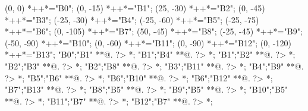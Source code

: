 \begin{scriptsize}
\xy(0, 0)
	*++{}*\frm{-,}="B0";
(0, -15)
	*++{}*\frm{-,}="B1";
(25, -30)
	*++{}*\frm{-,}="B2";
(0, -45)
	*++{}*\frm{-,}="B3";
(-25, -30)
	*++{}*\frm{-,}="B4";
(-25, -60)
	*++{}*\frm{-,}="B5";
(-25, -75)
	*++{}*\frm{-,}="B6";
(0, -105)
	*++{}*\frm{-,}="B7";
(50, -45)
	*++{}*\frm{-,}="B8";
(-25, -45)
	*++{}*\frm{-,}="B9";
(-50, -90)
	*++{}*\frm{-,}="B10";
(0, -60)
	*++{}*\frm{-,}="B11";
(0, -90)
	*++{}*\frm{-,}="B12";
(0, -120)
	*++{}*\frm{-,}="B13";
"B0";"B1" **@{.} ?> *{\dir{>}};
"B1";"B4" **@{.} ?> *{\dir{>}};
"B1";"B2" **@{.} ?> *{\dir{>}};
"B2";"B3" **@{.} ?> *{\dir{>}};
"B2";"B8" **@{.} ?> *{\dir{>}};
"B3";"B11" **@{.} ?> *{\dir{>}};
"B4";"B9" **@{.} ?> *{\dir{>}};
"B5";"B6" **@{.} ?> *{\dir{>}};
"B6";"B10" **@{.} ?> *{\dir{>}};
"B6";"B12" **@{.} ?> *{\dir{>}};
"B7";"B13" **@{.} ?> *{\dir{>}};
"B8";"B5" **@{.} ?> *{\dir{>}};
"B9";"B5" **@{.} ?> *{\dir{>}};
"B10";"B5" **@{.} ?> *{\dir{>}};
"B11";"B7" **@{.} ?> *{\dir{>}};
"B12";"B7" **@{.} ?> *{\dir{>}};
\endxy
\end{scriptsize}


